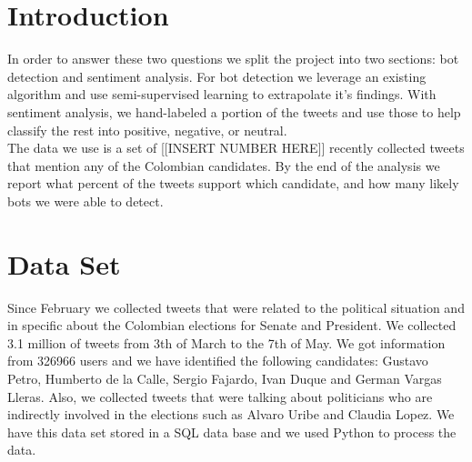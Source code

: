 \documentclass[10pt,a4paper]{article} %
\begin{document}
	\pagestyle{plain}
	\title{\rmfamily\normalfont{}}
	\author{ \\ }
	\date{} %
	
	\maketitle
	
	\begin{abstract}
		\noindent Between May and June of 2018 the people of Colombia will vote for their next president.  As with any modern election, people are using Twitter, the social media platform, to support candidates they like, discredit the others, and debate who should win.  Twitter provides a massive open forum to create dialogue across the country.  Some groups take advantage of this by creating \textit{social bots}, which automatically post political tweets to in an attempt to sway votors \cite{swaine_2018}.  In our project, we use the text mining skills gained in this course to assess the influence of these bots.  We hope to answer two questions: how many bots are there and who are they supporting?
		
	\end{abstract}
	
	\section{Introduction}
		In order to answer these two questions we split the project into two sections:  bot detection and sentiment analysis.  For bot detection we leverage an existing algorithm and use semi-supervised learning to extrapolate it's findings.  With sentiment analysis, we hand-labeled a portion of the tweets and use those to help classify the rest into positive, negative, or neutral. \\
		
		\noindent The data we use is a set of [[INSERT NUMBER HERE]] recently collected tweets that mention any of the Colombian candidates.  By the end of the analysis we report what percent of the tweets support which candidate, and how many likely bots we were able to detect.
	\section{Data Set}
	Since February we collected tweets that were related to the political situation and in specific about the Colombian elections for Senate and President. We collected 3.1 million of tweets from 3th of March to the 7th of May. We got information from 326966 users and we have identified the following candidates: Gustavo Petro, Humberto de la Calle, Sergio Fajardo, Ivan Duque and German Vargas Lleras. Also, we collected tweets that were talking about politicians who are indirectly involved in the elections such as Alvaro Uribe and Claudia Lopez. We have this data set stored in a SQL data base and we used Python to process the data.
\end{document}
